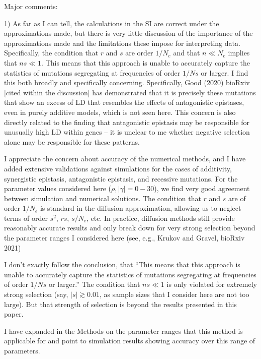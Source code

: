 \documentclass{article}
\newenvironment{response}%
  {\list{}{\leftmargin=0.5in\rightmargin=0.5in\color{blue}}\item[]}%
  {\endlist}
\begin{document}
Major comments:

1) As far as I can tell, the calculations in the SI are correct under the
approximations made, but there is very little discussion of the importance of
the approximations made and the limitations these impose for interpreting data.
Specifically, the condition that $r$ and $s$ are order $1/N_e$ and that $n \ll
N_e$ implies that $ns \ll 1$. This means that this approach is unable to
accurately capture the statistics of mutations segregating at frequencies of
order $1/Ns$ or larger. I find this both broadly and specifically concerning.
Specifically, Good (2020) bioRxiv [cited within the discussion] has
demonstrated that it is precisely these mutations that show an excess of LD
that resembles the effects of antagonistic epistases, even in purely additive
models, which is not seen here. This concern is also directly related to the
finding that antagonistic epistasis may be responsible for unusually high LD
within genes -- it is unclear to me whether negative selection alone may be
responsible for these patterns.

\begin{response}
    I appreciate the concern about accuracy of the numerical methods, and I
    have added extensive validations against simulations for the cases
    of additivity, synergistic epistasis, antagonistic epistasis, and recessive
    mutations. For the parameter values considered here
    ($\rho, |\gamma| = 0 - 30$), we find very good agreement between simulation
    and numerical solutions. The condition that $r$ and $s$ are of order $1/N_e$
    is standard in the diffusion approximation, allowing us to neglect terms
    of order $s^2$, $rs$, $s/N_e$, etc. In practice, diffusion methods still
    provide reasonably accurate results and only break down for very strong
    selection beyond the parameter ranges I considered here
    (see, e.g., Krukov and Gravel, bioRxiv 2021)

    I don't exactly follow the conclusion, that ``This means that this approach
    is unable to accurately capture the statistics of mutations segregating at
    frequencies of order $1/Ns$ or larger.'' The condition that $ns\ll 1$ is only
    violated for extremely strong selection (say, $|s| \gtrsim 0.01$, as sample sizes
    that I consider here are not too large). But that strength of selection is beyond
    the results presented in this paper.

    I have expanded in the Methods on the parameter ranges that this method is
    applicable for and point to simulation results showing accuracy over this range
    of parameters. 
\end{response}
\end{document}
